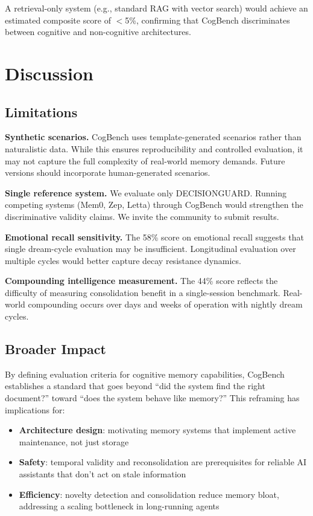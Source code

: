 \documentclass{article}
\begin{document}
A retrieval-only system (e.g., standard RAG with vector search) would achieve an estimated composite score of $<$5\%, confirming that CogBench discriminates between cognitive and non-cognitive architectures.

\section{Discussion}
\label{sec:discussion}

\subsection{Limitations}

\textbf{Synthetic scenarios.} CogBench uses template-generated scenarios rather than naturalistic data. While this ensures reproducibility and controlled evaluation, it may not capture the full complexity of real-world memory demands. Future versions should incorporate human-generated scenarios.

\textbf{Single reference system.} We evaluate only DECISIONGUARD. Running competing systems (Mem0, Zep, Letta) through CogBench would strengthen the discriminative validity claims. We invite the community to submit results.

\textbf{Emotional recall sensitivity.} The 58\% score on emotional recall suggests that single dream-cycle evaluation may be insufficient. Longitudinal evaluation over multiple cycles would better capture decay resistance dynamics.

\textbf{Compounding intelligence measurement.} The 44\% score reflects the difficulty of measuring consolidation benefit in a single-session benchmark. Real-world compounding occurs over days and weeks of operation with nightly dream cycles.

\subsection{Broader Impact}

By defining evaluation criteria for cognitive memory capabilities, CogBench establishes a standard that goes beyond ``did the system find the right document?'' toward ``does the system behave like memory?'' This reframing has implications for:

\begin{itemize}[nosep]
  \item \textbf{Architecture design}: motivating memory systems that implement active maintenance, not just storage
  \item \textbf{Safety}: temporal validity and reconsolidation are prerequisites for reliable AI assistants that don't act on stale information
  \item \textbf{Efficiency}: novelty detection and consolidation reduce memory bloat, addressing a scaling bottleneck in long-running agents
\end{itemize}
\end{document}

